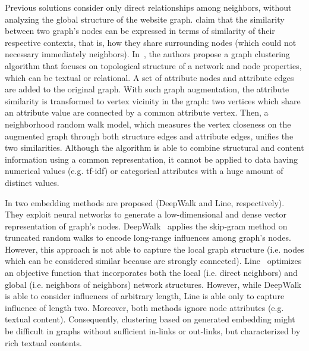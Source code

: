 Previous solutions consider only direct relationships among neighbors, without analyzing the global structure of the website graph. \cite{Zhou:2010, Gornerup:2015, Tang:2015, Perozzi:2014} claim that the similarity between two graph's nodes can be expressed in terms of similarity of their respective contexts, that is, how they share surrounding nodes (which could not necessary immediately neighbors). 
In~\cite{Zhou:2010}, the authors propose a graph clustering algorithm that focuses on topological structure of a network and node properties, which can be textual or relational.
A set of attribute nodes and attribute edges are added to the original graph. With such graph augmentation, the attribute similarity is transformed to vertex vicinity in the graph: two vertices which share an attribute value are connected by a common attribute vertex. Then, a neighborhood random walk model, which measures the vertex closeness on the augmented graph through both structure edges and attribute edges, unifies the two similarities. 
Although the algorithm is able to combine structural and content information using a common representation, it cannot be applied to data having numerical values (e.g. tf-idf) or categorical attributes with a huge amount of distinct values.


 

In \cite{Perozzi:2014, Tang:2015} two embedding methods are proposed (DeepWalk and Line, respectively). They  exploit neural networks to generate a low-dimensional and dense vector representation of graph's nodes. DeepWalk~\cite{Perozzi:2014} applies the skip-gram method on truncated random walks to encode long-range influences among graph's nodes. However, this approach is not able to capture the local graph structure (i.e. nodes which can be considered similar because are strongly connected).
Line~\cite{Tang:2015} optimizes an objective function that
incorporates both the local (i.e. direct neighbors) and global (i.e. neighbors of neighbors) network structures. However, while DeepWalk is able to consider influences of arbitrary length, Line is able only to capture influence of length two. Moreover, both methods ignore node attributes (e.g. textual content). Consequently, clustering based on generated embedding might be difficult in graphs without sufficient in-links or out-links, but characterized by rich textual contents.

